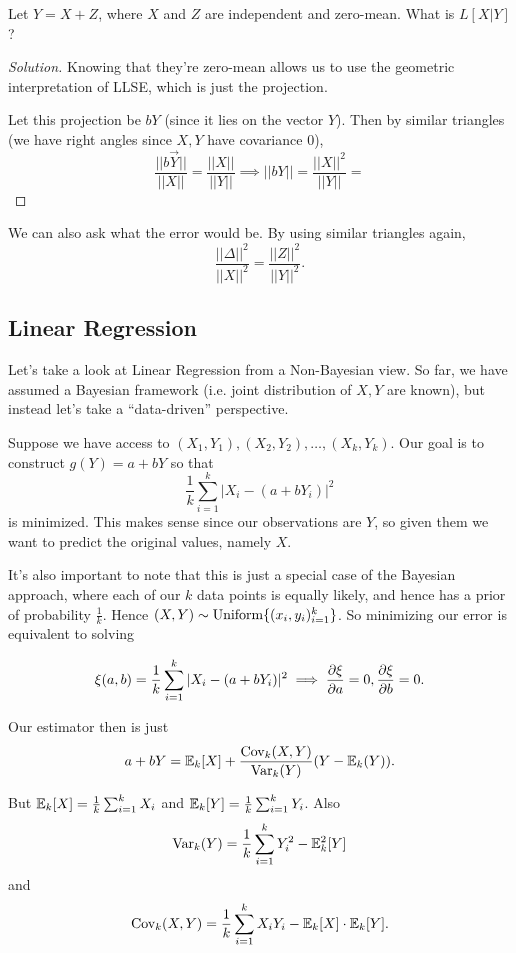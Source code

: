 \documentclass[11 pt]{scrartcl}
\begin{document}
\begin{example}
    Let $Y = X + Z$, where $X$ and $Z$ are independent and zero-mean. What is $L[X|Y]$? 
\end{example}
\begin{proof}[Solution]
    Knowing that they're zero-mean allows us to use the geometric interpretation of LLSE, which is just the projection. 

    Let this projection be $bY$ (since it lies on the vector $Y$). Then by similar triangles (we have right angles since $X,Y$ have covariance 0), 
    \[ \dfrac{||b\vec{Y}||}{||X||} = \dfrac{||X||}{||Y||} \implies ||bY|| = \dfrac{||X||^2}{||Y||} = \]
\end{proof}

We can also ask what the error would be. By using similar triangles again, 
    \[ \dfrac{||\Delta||^2}{||X||^2} = \dfrac{||Z||^2}{||Y||^2}.\] 

\subsection{Linear Regression}
Let's take a look at Linear Regression from a Non-Bayesian view. So far, we have assumed a Bayesian framework (i.e. joint distribution of $X,Y$ are known), but instead let's take a ``data-driven'' perspective.  

Suppose we have access to $(X_1, Y_1), (X_2, Y_2), \dots, (X_k, Y_k)$. Our goal is to construct $g(Y) = a + bY$ so that 
\[ \dfrac{1}{k} \sum_{i = 1}^k |X_i - (a + bY_i)|^2\]
is minimized. This makes sense since our observations are $Y$, so given them we want to predict the original values, namely $X$. 

It's also important to note that this is just a special case of the Bayesian approach, where each of our $k$ data points is equally likely, and hence has a prior of probability $\frac{1}{k}$. Hence $(X,Y) \sim \text{Uniform}\{(x_i, y_i)_{i=1}^k\}$. So minimizing our error is equivalent to solving 

\[ \xi(a,b) = \dfrac{1}{k}  \sum_{i = 1}^k |X_i - (a + bY_i)|^2 \implies \dfrac{\partial\xi}{\partial a} = 0, \dfrac{\partial\xi}{\partial b} = 0.\] 

Our estimator then is just 
\[ a + bY = \mathbb E_k[X] + \dfrac{\text{Cov}_k(X,Y)}{\text{Var}_k(Y)} (Y - \mathbb E_k(Y)).\] 

But $\mathbb E_k[X] = \frac{1}{k} \sum_{i=1}^k X_i$ and $\mathbb E_k[Y] = \frac{1}{k}\sum_{i=1}^k Y_i$. Also 
\[ \text{Var}_k(Y) = \frac{1}{k} \sum_{i=1}^k Y_i^2 - \mathbb E_k^2[Y] \] 
and 
\[ \text{Cov}_k(X,Y) = \frac{1}{k} \sum_{i=1}^k X_iY_i - \mathbb E_k[X] \cdot \mathbb E_k[Y].\] 
\end{document}
